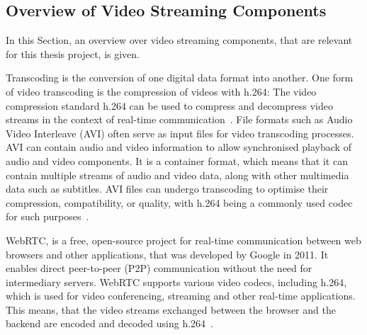 \documentclass[../MasterThesis.tex]{subfiles}
\begin{document}
\subsection{Overview of Video Streaming Components}
\label{subsection_OverviewVideoStreamingComponents}

In this Section, an overview over video streaming components, that are relevant for this thesis project, is given.

Transcoding is the conversion of one digital data format into another.
One form of video transcoding is the compression of videos with h.264:
The video compression standard h.264 can be used to compress and decompress video streams in the context of real-time communication~\cite{transcoding, h264}.
%	
File formats such as Audio Video Interleave (AVI) often serve as input files for video transcoding processes.
AVI can contain audio and video information to allow synchronised playback of audio and video components. 
It is a container format, which means that it can contain multiple streams of audio and video data, along with other multimedia data such as subtitles.
AVI files can undergo transcoding to optimise their compression, compatibility, or quality, with h.264 being a commonly used codec for such purposes~\cite{avi, h264}.


WebRTC, is a free, open-source project for real-time communication between web browsers and other applications, that was developed by Google in 2011. It enables direct peer-to-peer (P2P) communication without the need for intermediary servers.
WebRTC supports various video codecs, including h.264, which is used for video conferencing, streaming and other real-time applications. This means, that the video streams exchanged between the browser and the backend are encoded and decoded using h.264~\cite{webrtc, h264}.






\end{document}
